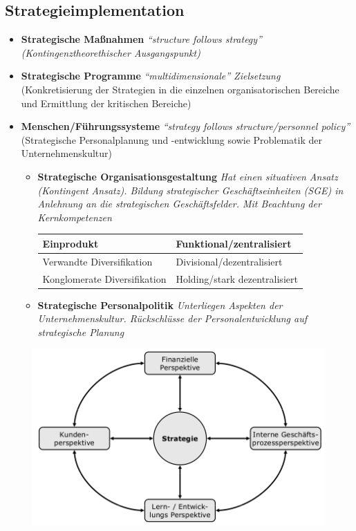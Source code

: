\documentclass[a4paper,11pt, twoside]{article}
\begin{document}
\subsection{Strategieimplementation}
\begin{itemize}
	\item \textbf{Strategische Maßnahmen} \textit{"`structure follows strategy"' (Kontingenztheorethischer Ausgangspunkt)}
	\item \textbf{Strategische Programme} \textit{"`multidimensionale"' Zielsetzung} (Konkretisierung der Strategien in die einzelnen organisatorischen Bereiche und Ermittlung der kritischen Bereiche)
	\item \textbf{Menschen/Führungssysteme} \textit{"`strategy follows structure/personnel policy"'} (Strategische Personalplanung und -entwicklung sowie Problematik der Unternehmenskultur)
	\begin{itemize}
		\item \textbf{Strategische Organisationsgestaltung} \textit{Hat einen situativen Ansatz (Kontingent Ansatz). Bildung strategischer Geschäftseinheiten (SGE) in Anlehnung an die strategischen Geschäftsfelder. Mit Beachtung der Kernkompetenzen}

\begin{tabular}{|l|l|}
\hline 
Einprodukt & Funktional/zentralisiert \\ 
\hline 
Verwandte Diversifikation & Divisional/dezentralisiert \\ 
\hline 
Konglomerate Diversifikation & Holding/stark dezentralisiert \\ 
\hline 
\end{tabular} 

	\item \textbf{Strategische Personalpolitik} \textit{Unterliegen Aspekten der Unternehmenskultur. Rückschlüsse der Personalentwicklung auf strategische Planung}

	\end{itemize}
\end{itemize}
\begin{figure}[h]
 \begin{center}
   \includegraphics[scale=0.2]{bilder/strategische_balancedscorecard.png}
 \end{center}
\end{figure}
\end{document}
